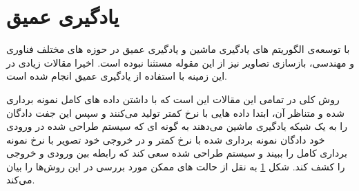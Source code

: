 \section{یادگیری عمیق}\label{ch:literature-review|sec:deep-learning}


با توسعه‌ی الگوریتم های یادگیری ماشین و یادگیری عمیق در حوزه های مختلف فناوری و مهندسی، بازسازی تصاویر \mri نیز از این مقوله مستثنا نبوده است. اخیرا مقالات زیادی در این زمینه با استفاده از یادگیری عمیق انجام شده است. 

\begin{figure}[t!]
	\centering
	\begin{copyrightBox}{\linewidth}{}
	\hspace{0.1\linewidth}
	
	\hspace{0.1\linewidth}
	\end{copyrightBox}
	\removevspace
	\caption{}
	\label{fig:deep-learning-model}
\end{figure}


روش کلی در تمامی این مقالات این است که با داشتن داده های کامل نمونه برداری شده
و \kspace متناظر‌ آن، ابتدا داده هایی با نرخ کمتر تولید می‌کنند و سپس این جفت دادگان را به یک شبکه یاد‌گیری ماشین می‌دهند به گونه ای که سیستم طراحی شده در ورودی خود دادگان \kspace نمونه برداری شده با نرخ کمتر و در خروجی خود تصویر \mri با نرخ نمونه برداری کامل را ببیند و سیستم طراحی شده سعی کند که رابطه بین ورودی و خروجی را کشف کند.
شکل \ref{fig:deep-learning-model}
به نقل از \cite{kSpace-deeplearning2020}
حالت های ممکن مورد بررسی در این روش‌ها را بیان ‌می‌کند.










